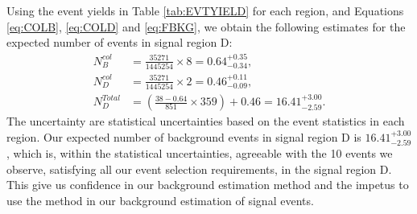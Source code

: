 \vspace{5mm}
Using the event yields in Table \ref{tab:EVTYIELD} for each region, and Equations \ref{eq:COLB}, \ref{eq:COLD} and \ref{eq:FBKG}, we obtain the following estimates for the expected number of events in signal region \textsf{D}:
\begin{align*} 
 N_{B}^{col} &= \frac{35271}{1445254} \times 8 = 0.64^{+0.35}_{-0.34} , \\
 N_{D}^{col} &= \frac{35271}{1445254} \times 2 = 0.46^{+0.11}_{-0.09} , \\
 N_{D}^{Total} &= \left( \frac{38 - 0.64}{851}\times 359\right) +  0.46 = 16.41^{+3.00}_{-2.59}.
\end{align*}
The uncertainty are statistical uncertainties based on the event statistics in each region. Our expected number of background events in signal region \textsf{D} is $16.41^{+3.00}_{-2.59}$,  which is, within the statistical uncertainties, agreeable with the 10 events we observe, satisfying all our event selection requirements, in the signal region \textsf{D}. 
This give us confidence in our background estimation method and the impetus to use the method in our background estimation of signal events.
